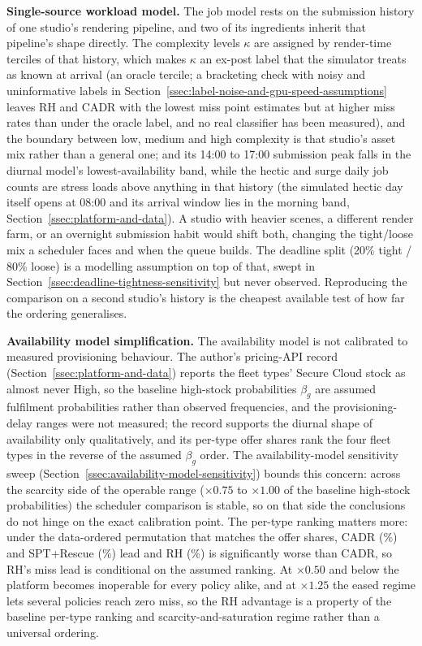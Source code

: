 {\textbf{Single-source workload model.} The job model rests on the submission history of one studio's rendering pipeline, and two of its ingredients inherit that pipeline's shape directly. The complexity levels $\kappa$ are assigned by render-time terciles of that history, which makes $\kappa$ an ex-post label that the simulator treats as known at arrival (an oracle tercile; a bracketing check with noisy and uninformative labels in Section~\ref{ssec:label-noise-and-gpu-speed-assumptions} leaves RH and CADR with the lowest miss point estimates but at higher miss rates than under the oracle label, and no real classifier has been measured), and the boundary between low, medium and high complexity is that studio's asset mix rather than a general one; and its 14:00 to 17:00 submission peak falls in the diurnal model's lowest-availability band, while the hectic and surge daily job counts are stress loads above anything in that history (the simulated hectic day itself opens at 08:00 and its arrival window lies in the morning band, Section~\ref{ssec:platform-and-data}). A studio with heavier scenes, a different render farm, or an overnight submission habit would shift both, changing the tight/loose mix a scheduler faces and when the queue builds. The deadline split (20\% tight / 80\% loose) is a modelling assumption on top of that, swept in Section~\ref{ssec:deadline-tightness-sensitivity} but never observed. Reproducing the comparison on a second studio's history is the cheapest available test of how far the ordering generalises.

\textbf{Availability model simplification.} The availability model is not calibrated to measured provisioning behaviour. The author's pricing-API record (Section~\ref{ssec:platform-and-data}) reports the fleet types' Secure Cloud stock as almost never High, so the baseline high-stock probabilities $\beta_g$ are assumed fulfilment probabilities rather than observed frequencies, and the provisioning-delay ranges were not measured; the record supports the diurnal shape of availability only qualitatively, and its per-type offer shares rank the four fleet types in the reverse of the assumed $\beta_g$ order. The availability-model sensitivity sweep (Section~\ref{ssec:availability-model-sensitivity}) bounds this concern: across the scarcity side of the operable range ($\times 0.75$ to $\times 1.00$ of the baseline high-stock probabilities) the scheduler comparison is stable, so on that side the conclusions do not hinge on the exact calibration point. The per-type ranking matters more: under the data-ordered permutation that matches the offer shares, CADR (\RevCADRmiss\%) and SPT+Rescue (\RevRescueMiss\%) lead and RH (\RevRHmiss\%) is significantly worse than CADR, so RH's miss lead is conditional on the assumed ranking. At $\times 0.50$ and below the platform becomes inoperable for every policy alike, and at $\times 1.25$ the eased regime lets several policies reach zero miss, so the RH advantage is a property of the baseline per-type ranking and scarcity-and-saturation regime rather than a universal ordering.

}
